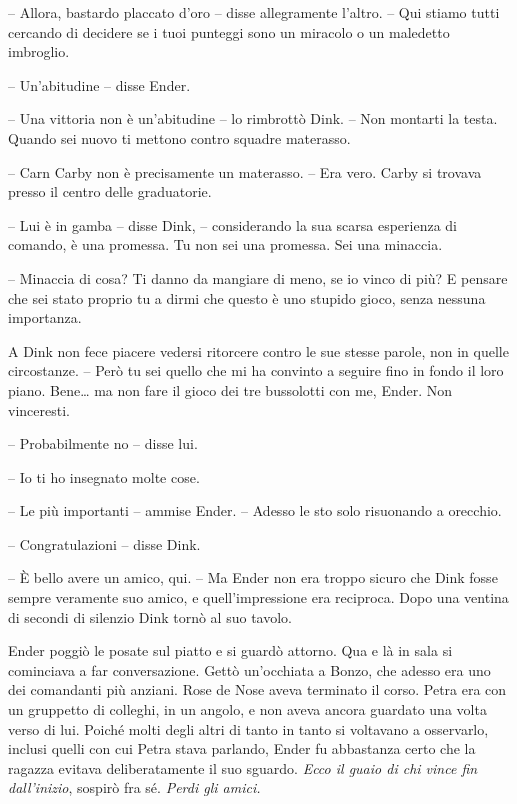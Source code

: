 {-- Allora, bastardo placcato d'oro -- disse allegramente l'altro. --
	Qui stiamo tutti cercando di decidere se i tuoi punteggi sono un
	miracolo o un maledetto imbroglio.}

{-- Un'abitudine -- disse Ender.}

{-- Una vittoria non è un'abitudine -- lo rimbrottò Dink. -- Non
	montarti la testa. Quando sei nuovo ti mettono contro squadre
	materasso.}

{-- Carn Carby non è precisamente un materasso. -- Era vero. Carby si
	trovava presso il centro delle graduatorie.}

{-- Lui è in gamba -- disse Dink, -- considerando la sua scarsa
	esperienza di comando, è una promessa. Tu non sei una promessa. Sei una
	minaccia.}

{-- Minaccia di cosa? Ti danno da mangiare di meno, se io vinco di più?
	E pensare che sei stato proprio tu a dirmi che questo è uno stupido
	gioco, senza nessuna importanza.}

{A Dink non fece piacere vedersi ritorcere contro le sue stesse parole,
	non in quelle circostanze. -- Però tu sei quello che mi ha convinto a
	seguire fino in fondo il loro piano. Bene\ldots{} ma non fare il gioco
	dei tre bussolotti con me, Ender. Non vinceresti.}

{-- Probabilmente no -- disse lui.}

{-- Io ti ho insegnato molte cose.}

{-- Le più importanti -- ammise Ender. -- Adesso le sto solo risuonando
	a orecchio.}

{-- Congratulazioni -- disse Dink.}

{-- È bello avere un amico, qui. -- Ma Ender non era troppo sicuro che
	Dink fosse sempre veramente suo amico, e quell'impressione era
	reciproca. Dopo una ventina di secondi di silenzio Dink tornò al suo
	tavolo.}

{Ender poggiò le posate sul piatto e si guardò attorno. Qua e là in sala
	si cominciava a far conversazione. Gettò un'occhiata a Bonzo, che adesso
	era uno dei comandanti più anziani. Rose de Nose aveva terminato il
	corso. Petra era con un gruppetto di colleghi, in un angolo, e non aveva
	ancora guardato una volta verso di lui. Poiché molti degli altri di
	tanto in tanto si voltavano a osservarlo, inclusi quelli con cui Petra
	stava parlando, Ender fu abbastanza certo che la ragazza evitava
	deliberatamente il suo sguardo. \emph{Ecco il guaio di chi vince fin
		dall'inizio}, \emph{} sospirò fra sé. \emph{Perdi gli amici.}}

